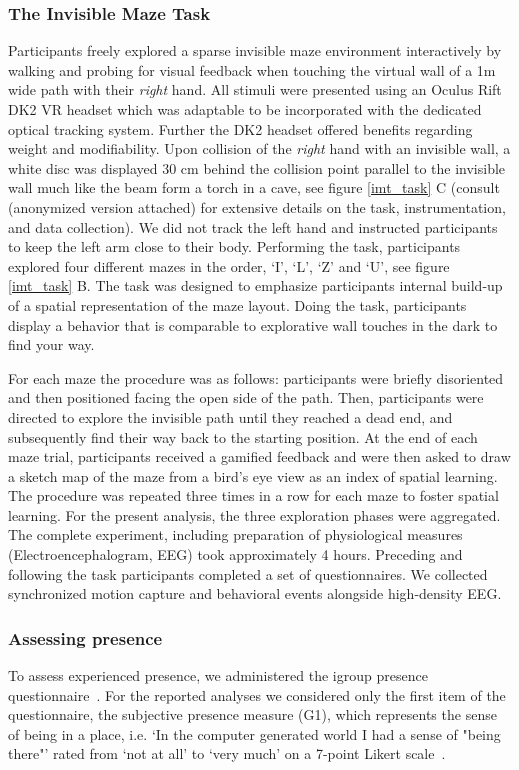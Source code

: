 \subsubsection{The Invisible Maze Task} Participants freely explored a sparse invisible maze environment interactively by walking and probing for visual feedback when touching the virtual wall of a 1m wide path with their \textit{right} hand. All stimuli were presented using an Oculus Rift DK2 VR headset which was adaptable to be incorporated with the dedicated optical tracking system. Further the DK2 headset offered benefits regarding weight and modifiability. Upon collision of the \textit{right} hand with an invisible wall, a white disc was displayed 30 cm behind the collision point parallel to the invisible wall much like the beam form a torch in a cave, see figure \ref{imt_task} C (consult~\cite{Gehrke2018} (anonymized version attached) for extensive details on the task, instrumentation, and data collection). We did not track the left hand and instructed participants to keep the left arm close to their body. Performing the task, participants explored four different mazes in the order, `I', `L', `Z' and `U', see figure \ref{imt_task} B. The task was designed to emphasize participants internal build-up of a spatial representation of the maze layout. Doing the task, participants display a behavior that is comparable to explorative wall touches in the dark to find your way.

For each maze the procedure was as follows: participants were briefly disoriented and then positioned facing the open side of the path. Then, participants were directed to explore the invisible path until they reached a dead end, and subsequently find their way back to the starting position. At the end of each maze trial, participants received a gamified feedback and were then asked to draw a sketch map of the maze from a bird’s eye view as an index of spatial learning. The procedure was repeated three times in a row for each maze to foster spatial learning. For the present analysis, the three exploration phases were aggregated. The complete experiment, including preparation of physiological measures (Electroencephalogram, EEG) took approximately 4 hours. Preceding and following the task participants completed a set of questionnaires. We collected synchronized motion capture and behavioral events alongside high-density EEG.

\subsubsection{Assessing presence} To assess experienced presence, we administered the igroup presence questionnaire~\cite{Schubert2003}. For the reported analyses we considered only the first item of the questionnaire, the subjective presence measure (G1), which represents the sense of being in a place, i.e. `In the computer generated world I had a sense of "being there"' rated from `not at all' to `very much' on a 7-point Likert scale~\cite{Schubert2003, Slater1993}.